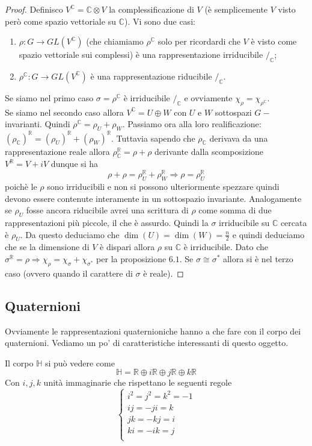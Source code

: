 \documentclass[11pt]{article}
\theoremstyle{plain}
\theoremstyle{definition}
\theoremstyle{remark}
\newcommand{\C}{\mathbb{C}}
\newcommand{\R}{\mathbb{R}}
\newcommand{\HH}{\mathbb{H}}
\begin{document}
\begin{proof} Definisco $V^\C=\C\otimes V$ la complessificazione di $V$ (è semplicemente $V$ visto però come spazio vettoriale su $\C$). Vi sono due casi:
\begin{enumerate}
\item $\rho:G\rightarrow GL(V^\C)$ (che chiamiamo $\rho^\C$ solo per ricordardi che $V$ è visto come spazio vettoriale sui complessi) è una rappresentazione irriducibile $/_\C$;
\item $\rho^\C:G\rightarrow GL(V^\C)$ è una rappresentazione riducibile $/_\C$.
\end{enumerate}
Se siamo nel primo caso $\sigma=\rho^\C$ è irriducibile $/_\C$ e ovviamente $\chi_\rho=\chi_{\rho^\C}$.\\
Se siamo nel secondo caso allora $V^\C=U\oplus W$ con $U$ e $W$ sottospazi $G-$invarianti. Quindi $\rho^\C=\rho_U+\rho_W$. Passiamo ora alla loro realificazione: $(\rho_\C)^\R=(\rho_U)^\R+(\rho_W)^\R$. Tuttavia sapendo che $\rho_\C$ derivava da una rappresentazione reale allora $\rho_\C^\R=\rho+\rho$ derivante dalla scomposizione $V^\R=V+iV$ dunque si ha
\[\rho+\rho=\rho_U^\R+\rho_W^\R\Rightarrow \rho=\rho_U^\R\]
 poichè le $\rho$ sono irriducibili e non si possono ulteriormente spezzare quindi devono essere contenute interamente in un sottospazio invariante. Analogamente se $\rho_U$ fosse ancora riducibile avrei una scrittura di $\rho$ come somma di due rappresentazioni più piccole, il che è assurdo. Quindi la $\sigma$ irriducibile su $\C$ cercata è $\rho_U$. Da questo deduciamo che $\dim(U)=\dim(W)=\frac{n}{2}$ e quindi deduciamo che se la dimensione di $V$ è dispari allora $\rho$ su $\C$ è irriducibile. Dato che $\sigma^\R=\rho\Rightarrow \chi_\rho=\chi_\sigma+\chi_{\sigma^*}$ per la proposizione $6.1$. Se $\sigma\cong \sigma^*$ allora si è nel terzo caso (ovvero quando il carattere di $\sigma$ è reale).

\end{proof}



\subsection{Quaternioni}
\label{sec:quaternioni}
Ovviamente le rappresentazioni quaternioniche hanno a che fare con il corpo dei quaternioni. Vediamo un po' di caratteristiche interessanti di questo oggetto.

Il corpo $\HH$ si può vedere come
\[\HH = \R \oplus i \R \oplus j \R \oplus k \R \]
Con $i,j,k$ unità immaginarie che rispettano le seguenti regole
\[
\begin{cases}
i^2 = j^2 = k^2 = -1 \\
ij = - ji = k \\
jk = -kj = i \\
ki = - ik = j \\
\end{cases}
\]
\end{document}
